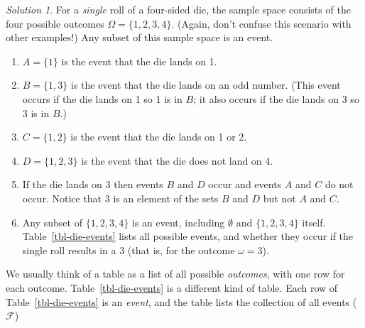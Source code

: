 \documentclass[
  letterpaper,
  DIV=11,
  numbers=noendperiod]{scrreprt}
\providecommand{\tightlist}{%
  \setlength{\itemsep}{0pt}\setlength{\parskip}{0pt}}
\theoremstyle{plain}
\theoremstyle{definition}
\theoremstyle{definition}
\theoremstyle{definition}
\theoremstyle{remark}
\newtheorem{refsolution}{Solution}[chapter]
\begin{document}
\begin{tcolorbox}[enhanced jigsaw, opacityback=0, rightrule=.15mm, coltitle=black, colframe=quarto-callout-tip-color-frame, toprule=.15mm, colbacktitle=quarto-callout-tip-color!10!white, opacitybacktitle=0.6, left=2mm, toptitle=1mm, breakable, title={Solution (click to expand)}, bottomtitle=1mm, colback=white, leftrule=.75mm, titlerule=0mm, arc=.35mm, bottomrule=.15mm]

\begin{refsolution}
For a \emph{single} roll of a four-sided die, the sample space consists
of the four possible outcomes \(\Omega = \{1, 2, 3, 4\}\). (Again, don't
confuse this scenario with other examples!) Any subset of this sample
space is an event.

\begin{enumerate}
\def\labelenumi{\arabic{enumi}.}
\tightlist
\item
  \(A = \{1\}\) is the event that the die lands on 1.
\item
  \(B = \{1, 3\}\) is the event that the die lands on an odd number.
  (This event occurs if the die lands on 1 so 1 is in \(B\); it also
  occurs if the die lands on 3 so 3 is in \(B\).)
\item
  \(C = \{1, 2\}\) is the event that the die lands on 1 or 2.
\item
  \(D = \{1, 2, 3\}\) is the event that the die does not land on 4.
\item
  If the die lands on 3 then events \(B\) and \(D\) occur and events
  \(A\) and \(C\) do not occur. Notice that 3 is an element of the sets
  \(B\) and \(D\) but not \(A\) and \(C\).
\item
  Any subset of \(\{1, 2, 3, 4\}\) is an event, including \(\emptyset\)
  and \(\{1, 2, 3, 4\}\) itself. Table~\ref{tbl-die-events} lists all
  possible events, and whether they occur if the single roll results in
  a 3 (that is, for the outcome \(\omega=3\)).
\end{enumerate}

\label{sol-die-sigma-field}

\end{refsolution}

\end{tcolorbox}

\begin{tcolorbox}[enhanced jigsaw, opacityback=0, rightrule=.15mm, coltitle=black, colframe=quarto-callout-caution-color-frame, toprule=.15mm, colbacktitle=quarto-callout-caution-color!10!white, opacitybacktitle=0.6, left=2mm, toptitle=1mm, breakable, title={Caution}, bottomtitle=1mm, colback=white, leftrule=.75mm, titlerule=0mm, arc=.35mm, bottomrule=.15mm]

We usually think of a table as a list of all possible \emph{outcomes},
with one row for each outcome. Table~\ref{tbl-die-events} is a different
kind of table. Each row of Table~\ref{tbl-die-events} is an
\emph{event}, and the table lists the collection of all events
(\(\mathcal{F}\))

\end{tcolorbox}
\end{document}
